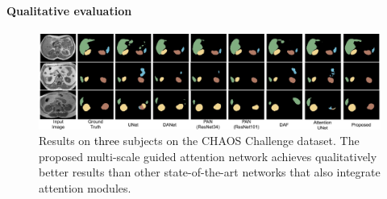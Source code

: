 \documentclass[journal]{IEEEtran}
\begin{document}

\paragraph*{\textbf{Qualitative evaluation}}

\begin{figure}[h!]
    \centering
    \includegraphics[width=1\textwidth]{VisualRes2.pdf}
    \caption{Results on \textcolor{black}{three} subjects on the CHAOS Challenge dataset. The proposed multi-scale guided attention network achieves qualitatively better results than other state-of-the-art networks that also integrate attention modules.}
        \label{fig:visualImages}
\end{figure}
\end{document}
